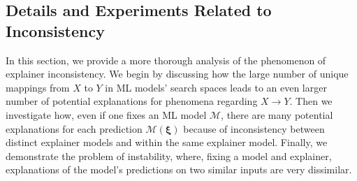 \documentclass[mnsc,blindrev]{informs3}
\begin{document}

    

     
    
    
   

    
    

    \subsection{Details and  Experiments Related to Inconsistency}
        \label{apx_sec:inconsistency}
        In this section, we provide a more thorough analysis of the phenomenon of explainer inconsistency. We begin by discussing how the large number of unique mappings from $X$ to $Y$ in ML models' search spaces leads to an even larger number of potential explanations for phenomena regarding $X\rightarrow Y$. Then we investigate how, even if one fixes an ML model $\mathcal{M}$, there are many potential explanations for each prediction $\mathcal{M}(\boldsymbol{\xi})$ because of inconsistency between distinct explainer models and within the same explainer model. Finally, we demonstrate the problem of instability, where, fixing a model and explainer, explanations of the model's predictions on two similar inputs are very dissimilar. 
        
\end{document}
